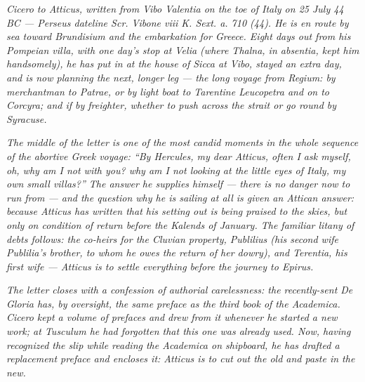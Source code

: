 
\textit{Cicero to Atticus, written from Vibo Valentia on the
toe of Italy on 25 July 44 BC --- Perseus dateline
\textit{Scr. Vibone viii K. Sext. a. 710 (44)}. He is en
route by sea toward Brundisium and the embarkation for
Greece. Eight days out from his Pompeian villa, with one
day's stop at Velia (where Thalna, in absentia, kept him
handsomely), he has put in at the house of Sicca at Vibo,
stayed an extra day, and is now planning the next, longer
leg --- the \textit{long voyage} from Regium: by merchantman
to Patrae, or by light boat to Tarentine Leucopetra and on to
Corcyra; and if by freighter, whether to push across the
strait or go round by Syracuse.}

\textit{The middle of the letter is one of the most candid
moments in the whole sequence of the abortive Greek voyage:
``By Hercules, my dear Atticus, often I ask myself, oh, why
am I not with you? why am I not looking at the little eyes of
Italy, my own small villas?'' The answer he supplies himself
--- there is no danger now to run from --- and the question
why he is sailing at all is given an Attican answer: because
Atticus has written that his setting out is being praised to
the skies, but only on condition of return before the Kalends
of January. The familiar litany of debts follows: the
co-heirs for the Cluvian property, Publilius (his second wife
Publilia's brother, to whom he owes the return of her dowry),
and Terentia, his first wife --- Atticus is to settle
everything before the journey to Epirus.}

\textit{The letter closes with a confession of authorial
carelessness: the recently-sent \textit{De Gloria} has, by
oversight, the same preface as the third book of the
\textit{Academica}. Cicero kept a volume of prefaces and drew
from it whenever he started a new work; at Tusculum he had
forgotten that this one was already used. Now, having
recognized the slip while reading the \textit{Academica} on
shipboard, he has drafted a replacement preface and encloses
it: Atticus is to cut out the old and paste in the new.}
